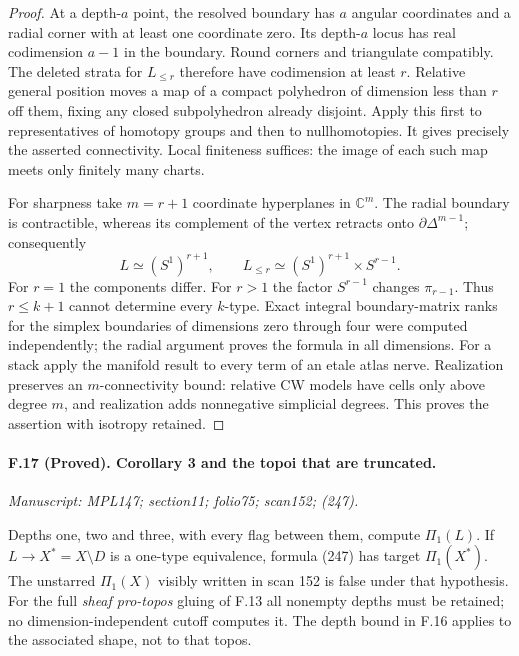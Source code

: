 \begin{proof}
At a depth-$a$ point, the resolved boundary has $a$ angular coordinates
and a radial corner with at least one coordinate zero. Its depth-$a$
locus has real codimension $a-1$ in the boundary. Round corners and
triangulate compatibly. The deleted strata for $L_{\leq r}$ therefore
have codimension at least $r$. Relative general position moves a map
of a compact polyhedron of dimension less than $r$ off them, fixing
any closed subpolyhedron already disjoint. Apply this first to
representatives of homotopy groups and then to nullhomotopies. It
gives precisely the asserted connectivity. Local finiteness suffices:
the image of each such map meets only finitely many charts.

For sharpness take $m=r+1$ coordinate hyperplanes in $\mathbb C^m$.
The radial boundary is contractible, whereas its complement of the
vertex retracts onto $\partial\Delta^{m-1}$; consequently
\[
 L\simeq(S^1)^{r+1},\qquad
 L_{\leq r}\simeq(S^1)^{r+1}\times S^{r-1}.
\]
For $r=1$ the components differ. For $r>1$ the factor $S^{r-1}$
changes $\pi_{r-1}$. Thus $r\leq k+1$ cannot determine every $k$-type.
Exact integral boundary-matrix ranks for the simplex boundaries of
dimensions zero through four were computed independently; the radial
argument proves the formula in all dimensions. For a stack apply the
manifold result to every term of an etale atlas nerve. Realization
preserves an $m$-connectivity bound: relative CW models have cells only
above degree $m$, and realization adds nonnegative simplicial degrees.
This proves the assertion with isotropy retained.
\end{proof}

\paragraph{F.17 (Proved). Corollary 3
and the topoi that are truncated.}
\textit{Manuscript: MPL147; section11; folio75; scan152; (247).}

Depths one, two and three, with every flag between them, compute
$\Pi_1(L)$. If $L\to X^*=X\setminus D$ is a one-type equivalence,
formula (247) has target $\Pi_1(X^*)$. The unstarred $\Pi_1(X)$ visibly
written in scan 152 is false under that hypothesis. For the full
\emph{sheaf pro-topos} gluing of F.13 all nonempty depths must be
retained; no dimension-independent cutoff computes it. The depth
bound in F.16 applies to the associated shape, not to that topos.

